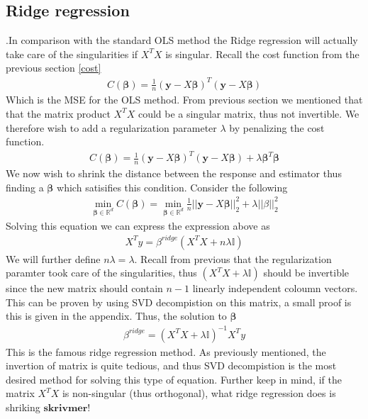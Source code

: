 \documentclass[a4paper, 10pt]{article}
\begin{document}
\subsection{Ridge regression} .In comparison with the standard OLS method the Ridge regression will actually take care of the singularities if $X^{T}X$ is singular. Recall the cost function from the previous section \eqref{cost}
\begin{align}
  C(\boldsymbol{\beta}) = \frac{1}{n}\left(\mathbf{y} - X\boldsymbol{\beta}\right)^{T}\left(\mathbf{y} - X\boldsymbol{\beta}\right)
\end{align}
Which is the MSE for the OLS method. From previous section we mentioned that that the matrix product $X^{T}X$ could be a singular matrix, thus not invertible. We therefore wish to add a regularization parameter $\lambda$ by penalizing the cost function.
\begin{align}
  C(\boldsymbol{\beta}) = \frac{1}{n}\left(\mathbf{y} - X\boldsymbol{\beta}\right)^{T}\left(\mathbf{y} - X\boldsymbol{\beta}\right) + \lambda\boldsymbol{\beta}^{T}\boldsymbol{\beta}
\end{align}
We now wish to shrink the distance between the response and estimator  thus finding a $\boldsymbol{\beta}$ which satisifies this condition. Consider the following
\begin{align}
  \min_{\boldsymbol{\beta}\in \mathbb{R}^{d}}C(\boldsymbol{\beta}) = \min_{\boldsymbol{\beta}\in \mathbb{R}^{d}}
  \frac{1}{n}||\mathbf{y} - X\boldsymbol{\beta}||^{2}_{2} + \lambda||\beta||_{2}^{2}
\end{align}
Solving this equation we can express the expression above as
\begin{align}
    X^{T}y = \beta^{ridge}(X^{T}X + n\lambda\mathbb{I})
\end{align}
We will further define $n\lambda = \lambda$. Recall from previous that the regularization paramter took care of the singularities, thus $(X^{T}X + \lambda\mathbb{I})$ should be invertible since the new matrix should contain $n-1$ linearly independent coloumn vectors. This can be proven by using SVD decompistion on this matrix, a small proof is this is given in the appendix. Thus, the solution to $\boldsymbol{\beta}$
\begin{align}
  \beta^{ridge} = (X^{T}X + \lambda\mathbb{I})^{-1}X^{T}y
\end{align}
This is the famous ridge regression method. As previously mentioned, the invertion of matrix is quite tedious, and thus SVD decompistion is the most desired method for solving this type of equation. Further keep in mind, if the matrix $X^{T}X$ is non-singular (thus orthogonal), what ridge regression does is shriking $\boldsymbol{skriv mer!}$
\end{document}
